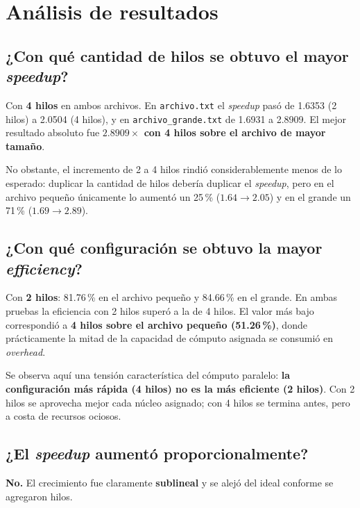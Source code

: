 \documentclass[11pt,letterpaper]{article}
\newcommand{\destacado}[2][azulcl]{%
  \begin{cajadest}[#1]\small #2\end{cajadest}}
\begin{document}
\section{Análisis de resultados}
\label{sec:analisis}

\subsection{¿Con qué cantidad de hilos se obtuvo el mayor \emph{speedup}?}

Con \textbf{4 hilos} en ambos archivos. En \texttt{archivo.txt} el \emph{speedup}
pasó de 1.6353 (2 hilos) a 2.0504 (4 hilos), y en \texttt{archivo\_grande.txt} de
1.6931 a 2.8909. El mejor resultado absoluto fue \textbf{$2.8909\times$ con 4
hilos sobre el archivo de mayor tamaño}.

No obstante, el incremento de 2 a 4 hilos rindió considerablemente menos de lo
esperado: duplicar la cantidad de hilos debería duplicar el \emph{speedup}, pero
en el archivo pequeño únicamente lo aumentó un 25\,\% ($1.64 \rightarrow 2.05$) y
en el grande un 71\,\% ($1.69 \rightarrow 2.89$).

\subsection{¿Con qué configuración se obtuvo la mayor \emph{efficiency}?}

Con \textbf{2 hilos}: 81.76\,\% en el archivo pequeño y 84.66\,\% en el grande. En
ambas pruebas la eficiencia con 2 hilos superó a la de 4 hilos. El valor más bajo
correspondió a \textbf{4 hilos sobre el archivo pequeño (51.26\,\%)}, donde
prácticamente la mitad de la capacidad de cómputo asignada se consumió en
\emph{overhead}.

\destacado[naranja]{Se observa aquí una tensión característica del cómputo
paralelo: \textbf{la configuración más rápida (4 hilos) no es la más eficiente
(2 hilos)}. Con 2 hilos se aprovecha mejor cada núcleo asignado; con 4 hilos se
termina antes, pero a costa de recursos ociosos.}

\subsection{¿El \emph{speedup} aumentó proporcionalmente?}

\textbf{No.} El crecimiento fue claramente \textbf{sublineal} y se alejó del ideal
conforme se agregaron hilos.
\end{document}
